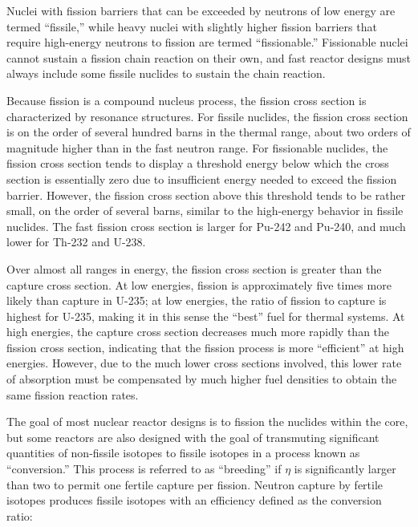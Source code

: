 Nuclei with fission barriers that can be exceeded by neutrons of low energy are termed ``fissile,'' while heavy nuclei with slightly higher fission barriers that require high-energy neutrons to fission are termed ``fissionable.'' Fissionable nuclei cannot sustain a fission chain reaction on their own, and fast reactor designs must always include some fissile nuclides to sustain the chain reaction. %

Because fission is a compound nucleus process, the fission cross section is characterized by resonance structures. For fissile nuclides, the fission cross section is on the order of several hundred barns in the thermal range, about two orders of magnitude higher than in the fast neutron range. For fissionable nuclides, the fission cross section tends to display a threshold energy below which the cross section is essentially zero due to insufficient energy needed to exceed the fission barrier. However, the fission cross section above this threshold tends to be rather small, on the order of several barns, similar to the high-energy behavior in fissile nuclides. The fast fission cross section is larger for Pu-242 and Pu-240, and much lower for Th-232 and U-238. 

Over almost all ranges in energy, the fission cross section is greater than the capture cross section. At low energies, fission is approximately five times more likely than capture in U-235; at low energies, the ratio of fission to capture is highest for U-235, making it in this sense the ``best'' fuel for thermal systems. At high energies, the capture cross section decreases much more rapidly than the fission cross section, indicating that the fission process is more ``efficient'' at high energies. However, due to the much lower cross sections involved, this lower rate of absorption must be compensated by much higher fuel densities to obtain the same fission reaction rates. 

The goal of most nuclear reactor designs is to fission the nuclides within the core, but some reactors are also designed with the goal of transmuting significant quantities of non-fissile isotopes to fissile isotopes in a process known as ``conversion.'' This process is referred to as ``breeding'' if \(\eta\) is significantly larger than two to permit one fertile capture per fission. Neutron capture by fertile isotopes produces fissile isotopes with an efficiency defined as the conversion ratio:

\beq
\label{eq:ConversionRatioDef}
\equiv{}
\eeq

